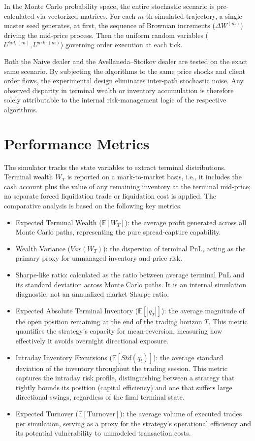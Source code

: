 \documentclass[a4paper,10pt,titlepage,oneside,openany]{book}
\theoremstyle{plain}\newtheorem{theorem}{Theorem}[chapter]
\theoremstyle{definition}\newtheorem{definition}{Definition}[chapter]
\theoremstyle{remark}\newtheorem{remark}{Remark}[chapter]
\begin{document}
In the Monte Carlo probability space, the entire stochastic scenario is pre-calculated via vectorized matrices. For each $m$-th simulated trajectory, a single master seed generates, at first, the sequence of Brownian increments ($\Delta W^{(m)}$) driving the mid-price process. Then the uniform random variables ($U^{bid, (m)}, U^{ask, (m)}$) governing order execution at each tick.

Both the Naive dealer and the Avellaneda--Stoikov dealer are tested on the exact same scenario. By subjecting the algorithms to the same price shocks and client order flows, the experimental design eliminates inter-path stochastic noise. Any observed disparity in terminal wealth or inventory accumulation is therefore solely attributable to the internal risk-management logic of the respective algorithms.

\section{Performance Metrics}
The simulator tracks the state variables to extract terminal distributions. Terminal wealth $W_T$ is reported on a mark-to-market basis, i.e., it includes the cash account plus the value of any remaining inventory at the terminal mid-price; no separate forced liquidation trade or liquidation cost is applied. The comparative analysis is based on the following key metrics:

\begin{itemize}
    \item Expected Terminal Wealth ($\mathbb{E}[W_T]$): the average profit generated across all Monte Carlo paths, representing the pure spread-capture capability.
    \item Wealth Variance ($Var(W_T)$): the dispersion of terminal PnL, acting as the primary proxy for unmanaged inventory and price risk.
    \item Sharpe-like ratio: calculated as the ratio between average terminal PnL and its standard deviation across Monte Carlo paths. It is an internal simulation diagnostic, not an annualized market Sharpe ratio.
    \item Expected Absolute Terminal Inventory ($\mathbb{E}[|q_T|]$): the average magnitude of the open position remaining at the end of the trading horizon $T$. This metric quantifies the strategy's capacity for mean-reversion, measuring how effectively it avoids overnight directional exposure.
    \item Intraday Inventory Excursions ($\mathbb{E}[Std(q_t)]$): the average standard deviation of the inventory throughout the trading session. This metric captures the intraday risk profile, distinguishing between a strategy that tightly bounds its position (capital efficiency) and one that suffers large directional swings, regardless of the final terminal state.
    \item Expected Turnover ($\mathbb{E}[\text{Turnover}]$): the average volume of executed trades per simulation, serving as a proxy for the strategy's operational efficiency and its potential vulnerability to unmodeled transaction costs.
\end{itemize}
\end{document}

